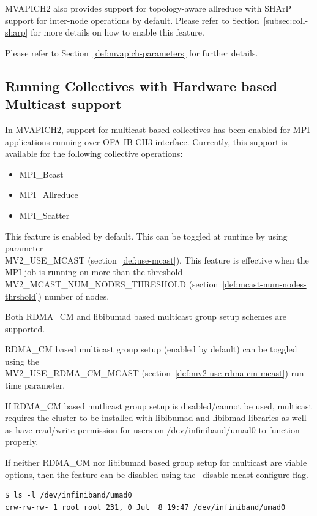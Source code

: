 MVAPICH2 also provides support for topology-aware allreduce with SHArP support
for inter-node operations by default. Please refer to
Section~\ref{subsec:coll-sharp} for more details on how to enable this feature.

Please refer to Section~\ref{def:mvapich-parameters} for further details.

\subsection{Running Collectives with Hardware based Multicast support}
\label{subsec:coll-mcast}

In MVAPICH2, support for multicast based collectives has
been enabled for MPI applications running over OFA-IB-CH3 interface.
Currently, this support is available for the following
collective operations:

\begin{itemize}
		\item{MPI\_Bcast}
		\item{MPI\_Allreduce}
		\item{MPI\_Scatter}
\end{itemize}

This feature is enabled by default. This can be toggled at runtime by using
parameter \\
MV2\_USE\_MCAST (section~\ref{def:use-mcast}).  This feature is effective when the MPI job is running on
more than the threshold \\
MV2\_MCAST\_NUM\_NODES\_THRESHOLD (section~\ref{def:mcast-num-nodes-thrshold})
number of nodes.

Both RDMA\_CM and libibumad based multicast group setup schemes are supported.

RDMA\_CM based multicast group setup (enabled by default) can be toggled using
the \\ MV2\_USE\_RDMA\_CM\_MCAST (section~\ref{def:mv2-use-rdma-cm-mcast}) run-time parameter.

If RDMA\_CM based mutlicast group setup is disabled/cannot be used, multicast requires the cluster to be installed with 
libibumad and libibmad libraries as well as have read/write permission for users on /dev/infiniband/umad0 to function properly.

If neither RDMA\_CM nor libibumad based group setup for multicast are viable options, then the feature can be disabled using the --disable-mcast configure flag.
\begin{verbatim}
$ ls -l /dev/infiniband/umad0
crw-rw-rw- 1 root root 231, 0 Jul  8 19:47 /dev/infiniband/umad0
\end{verbatim}

